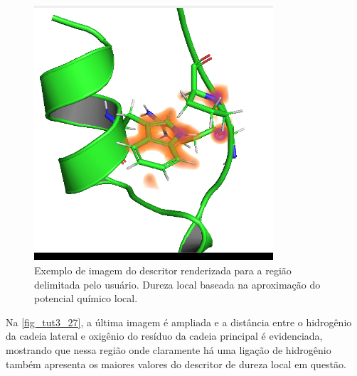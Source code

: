 \documentclass[a4paper,11pt]{refart}
\begin{document}
\hspace*{-\leftmarginwidth}
\begin{minipage}{\fullwidth}
	\begin{figure}[H]
		\begin{center}
			\includegraphics[width=3.5in]{images/tut3_img27}
			\caption{Exemplo de imagem do descritor renderizada para a região delimitada pelo usuário. Dureza local baseada na aproximação do potencial químico local.}
			\label{fig_tut3_26}
		\end{center}
	\end{figure}
\end{minipage}

Na \autoref{fig_tut3_27}, a última imagem é ampliada e a distância entre o hidrogênio da cadeia lateral e oxigênio do resíduo da cadeia principal é evidenciada, mostrando que nessa região onde claramente há uma ligação de hidrogênio também apresenta os maiores valores do descritor de dureza local em questão.  
\end{document}
